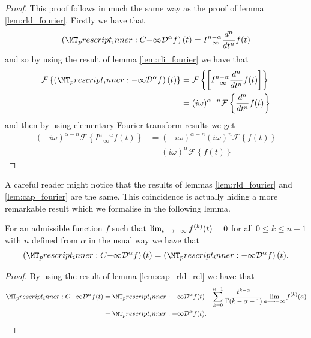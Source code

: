 \begin{proof}
This proof follows in much the same way as the proof of lemma \ref{lem:rld_fourier}.
Firstly we have that
    \begin{align*}
        \left(\prescript{C}{-\infty}{\mathcal{D}}^\alpha f\right)(t) =  I_{-\infty}^{n - \alpha} \frac{d^n}{dt^n}f(t)
    \end{align*}
    and so by using the result of lemma \ref{lem:rli_fourier} we have that
    \begin{align*}
        \mathcal{F}\left\{ \left(\prescript{}{-\infty}{\mathcal{D}}^\alpha f\right)(t) \right\}  &=
        \mathcal{F}\left\{ \left[ I_{-\infty}^{n-\alpha} \frac{d^n}{dt^n}f(t) \right] \right\} \\
        &= (i\omega)^{\alpha - n} \mathcal{F}\left\{ \frac{d^n}{dt^n}f(t) \right\}
    \end{align*}
    and then by using elementary Fourier transform results we get
    \begin{align*}
        (-i\omega)^{\alpha -n} \mathcal{F}\left\{ I_{-\infty}^{n-\alpha} f(t) \right\} &= (-i\omega)^{\alpha - n}(i\omega)^{n}\mathcal{F}\left\{ f(t)\right\} \\
        &= (i\omega)^\alpha  \mathcal{F}\left\{ f(t) \right\}
    \end{align*}
\end{proof}
A careful reader might notice that the results of lemmas \ref{lem:rld_fourier} and \ref{lem:cap_fourier} are the same. This coincidence is actually hiding a more remarkable result which we formalise in the following lemma.
\begin{mdframed}[innertopmargin=10pt]
\begin{lemma}
    For an admissible function $ f $ such that $ \lim_{t \longrightarrow -\infty} f^{(k)}(t) = 0 $ for all $ 0 \leq k \leq n-1 $ with $ n $ defined from $ \alpha $ in the usual way we have that
    \begin{align*}
        \left(\prescript{C}{-\infty}{\mathcal{D}}^\alpha f\right)(t) = \left( \prescript{}{-\infty}{\mathcal{D}}^\alpha f \right)(t).
    \end{align*}
\end{lemma}
\end{mdframed}
\begin{proof}
    By using the result of lemma \ref{lem:cap_rld_rel} we have that
    \begin{align*}
        \prescript{C}{-\infty}{\mathcal{D}}^\alpha f(t) &= \prescript{}{-\infty}{\mathcal{D}}^\alpha f(t) - \sum_{k=0}^{n-1} \frac{t^{k-\alpha}}{\Gamma(k - \alpha + 1)}\lim_{a \lra -\infty}f^{(k)}(a) \\
    &=  \prescript{}{-\infty}{\mathcal{D}}^\alpha f(t). 
    \end{align*}
\end{proof}

